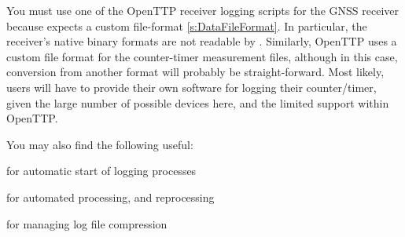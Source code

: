 You must use one of the OpenTTP receiver logging scripts for the GNSS receiver because 
expects a custom file-format \ref{s:DataFileFormat}. In particular, the
receiver's native binary formats are not readable by . Similarly, OpenTTP uses a custom file
format for the counter-timer measurement files, although in this case, conversion from another format
will probably be straight-forward. Most likely, users will have to provide their own software for
logging their counter/timer, given the large number of possible devices here, and the limited
support within OpenTTP.

You may also find the following useful:
\begin{description*}
	\item[]  for automatic start of logging processes
	\item[]  for automated processing, and reprocessing
	\item[]  for managing log file compression
\end{description*} 
